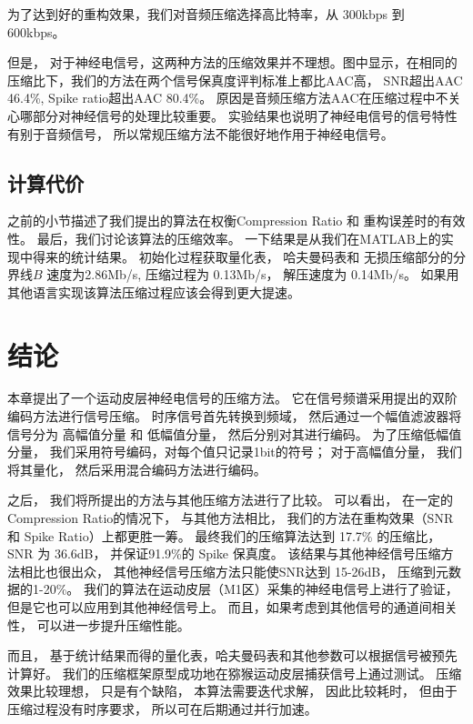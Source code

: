 为了达到好的重构效果，我们对音频压缩选择高比特率，从 300kbps 到 600kbps。 

但是， 对于神经电信号，这两种方法的压缩效果并不理想。图中显示，在相同的压缩比下，我们的方法在两个信号保真度评判标准上都比AAC高， SNR超出AAC 46.4\%, Spike ratio超出AAC 80.4\%。 原因是音频压缩方法AAC在压缩过程中不关心哪部分对神经信号的处理比较重要。 实验结果也说明了神经电信号的信号特性有别于音频信号， 所以常规压缩方法不能很好地作用于神经电信号。 





\subsection{计算代价}
之前的小节描述了我们提出的算法在权衡Compression Ratio 和 重构误差时的有效性。 最后，我们讨论该算法的压缩效率。 一下结果是从我们在MATLAB上的实现中得来的统计结果。 初始化过程获取量化表， 哈夫曼码表和 无损压缩部分的分界线$B$ 速度为2.86Mb/s, 压缩过程为 0.13Mb/s， 解压速度为 0.14Mb/s。 如果用其他语言实现该算法压缩过程应该会得到更大提速。 




\section{结论}
本章提出了一个运动皮层神经电信号的压缩方法。 它在信号频谱采用提出的双阶编码方法进行信号压缩。 时序信号首先转换到频域， 然后通过一个幅值滤波器将信号分为 高幅值分量 和 低幅值分量， 然后分别对其进行编码。 为了压缩低幅值分量， 我们采用符号编码，对每个值只记录1bit的符号； 对于高幅值分量， 我们将其量化， 然后采用混合编码方法进行编码。 

之后， 我们将所提出的方法与其他压缩方法进行了比较。 可以看出， 在一定的Compression Ratio的情况下， 与其他方法相比， 我们的方法在重构效果（SNR 和 Spike Ratio）上都更胜一筹。 最终我们的压缩算法达到 17.7\% 的压缩比， SNR 为 36.6dB， 并保证91.9\%的 Spike 保真度。 该结果与其他神经信号压缩方法相比也很出众， 其他神经信号压缩方法只能使SNR达到 15-26dB， 压缩到元数据的1-20\%\cite{15,16,25}。 我们的算法在运动皮层（M1区）采集的神经电信号上进行了验证， 但是它也可以应用到其他神经信号上。 而且，如果考虑到其他信号的通道间相关性， 可以进一步提升压缩性能。 

而且， 基于统计结果而得的量化表，哈夫曼码表和其他参数可以根据信号被预先计算好。 我们的压缩框架原型成功地在猕猴运动皮层捕获信号上通过测试。 压缩效果比较理想， 只是有个缺陷， 本算法需要迭代求解， 因此比较耗时， 但由于压缩过程没有时序要求， 所以可在后期通过并行加速。












